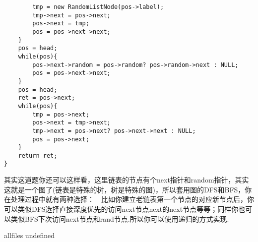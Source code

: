 \documentclass{article}
\begin{document}
\begin{CJK}{UTF8}{gbsn}
\begin{description}
\begin{lstlisting}
		tmp = new RandomListNode(pos->label);	
		tmp->next = pos->next;
		pos->next = tmp;
		pos = pos->next->next;
	}
	pos = head;
	while(pos){
		pos->next->random = pos->random? pos->random->next : NULL;
		pos = pos->next->next;
	}
	pos = head;
	ret = pos->next;
	while(pos){
		tmp = pos->next;
		pos->next = tmp->next;
		tmp->next = pos->next? pos->next->next : NULL;
		pos = pos->next;
	}
	return ret;
}
    \end{lstlisting}
	其实这道题你还可以这样看，这里链表的节点有个next指针和random指针，其实这就是一个图了(链表是特殊的树，树是特殊的图)，所以套用图的DFS和BFS，你在处理过程中就有两种选择：　比如你建立老链表第一个节点的对应新节点后，你可以类似DFS选择直接深度优先的访问next节点next的next节点等等；同样你也可以类似BFS下次访问next节点和rand节点.所以你可以使用递归的方式实现.
\end{description}

\fi

\ifx allfiles undefined
\end{CJK}
\end{document}
